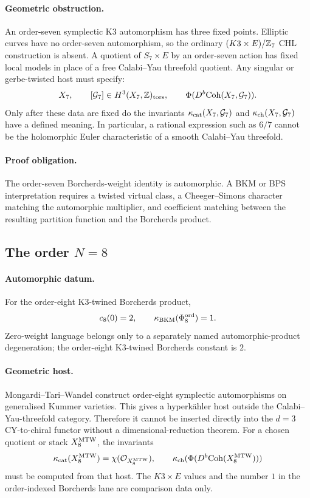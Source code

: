 \paragraph{Geometric obstruction.}
An order-seven symplectic K3 automorphism has three fixed points.
Elliptic curves have no order-seven automorphism, so the ordinary
\((K3\times E)/\mathbb{Z}_7\) CHL construction is absent.  A quotient of
\(S_7\times E\) by an order-seven action has fixed local models in
place of a free Calabi--Yau threefold quotient.  Any singular or
gerbe-twisted host must specify:
\[
  X_7,\qquad [\mathcal{G}_7]\in H^3(X_7,\mathbb{Z})_{\mathrm{tors}},\qquad
  \Phi(D^b\mathrm{Coh}(X_7,\mathcal{G}_7)).
\]
Only after these data are fixed do the invariants
\(\kappa_{\mathrm{cat}}(X_7,\mathcal{G}_7)\) and \(\kappa_{\mathrm{ch}}(X_7,\mathcal{G}_7)\) have a defined meaning.
In particular, a rational expression such as \(6/7\) cannot be the
holomorphic Euler characteristic of a smooth Calabi--Yau threefold.

\paragraph{Proof obligation.}
The order-seven Borcherds-weight identity is automorphic.  A BKM or BPS
interpretation requires a twisted virtual class, a Cheeger--Simons
character matching the automorphic multiplier, and coefficient matching
between the resulting partition function and the Borcherds product.

\subsection*{The order \(N=8\)}

\paragraph{Automorphic datum.}
For the order-eight K3-twined Borcherds product,
\[
  c_8(0)=2,\qquad \kappa_{\mathrm{BKM}}(\Phi_8^{\mathrm{ord}})=1.
\]
Zero-weight language belongs only to a separately named
automorphic-product degeneration; the order-eight K3-twined Borcherds
constant is \(2\).

\paragraph{Geometric host.}
Mongardi--Tari--Wandel construct order-eight symplectic automorphisms on
generalised Kummer varieties.  This gives a hyperk\"ahler host outside
the Calabi--Yau-threefold category.  Therefore it cannot be inserted
directly into the \(d=3\) CY-to-chiral functor without a
dimensional-reduction theorem.
For a chosen quotient or stack \(X_8^{\mathrm{MTW}}\), the invariants
\[
  \kappa_{\mathrm{cat}}(X_8^{\mathrm{MTW}})=\chi(\mathcal{O}_{X_8^{\mathrm{MTW}}}),\qquad
  \kappa_{\mathrm{ch}}(\Phi(D^b\mathrm{Coh}(X_8^{\mathrm{MTW}})))
\]
must be computed from that host.  The \(K3\times E\) values and the
number \(1\) in the order-indexed Borcherds lane are comparison data
only.

